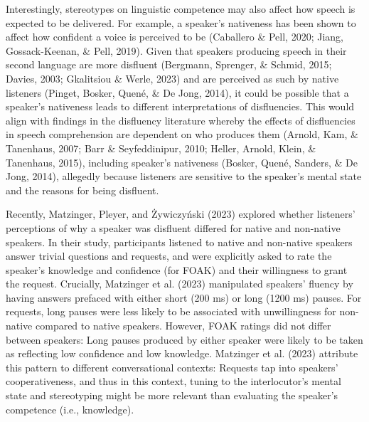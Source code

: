 \documentclass[
  man,floatsintext]{apa7}
\begin{document}
Interestingly, stereotypes on linguistic competence may also affect how speech is expected to be delivered. For example, a speaker's nativeness has been shown to affect how confident a voice is perceived to be (Caballero \& Pell, 2020; Jiang, Gossack-Keenan, \& Pell, 2019). Given that speakers producing speech in their second language are more disfluent (Bergmann, Sprenger, \& Schmid, 2015; Davies, 2003; Gkalitsiou \& Werle, 2023) and are perceived as such by native listeners (Pinget, Bosker, Quené, \& De Jong, 2014), it could be possible that a speaker's nativeness leads to different interpretations of disfluencies. This would align with findings in the disfluency literature whereby the effects of disfluencies in speech comprehension are dependent on who produces them (Arnold, Kam, \& Tanenhaus, 2007; Barr \& Seyfeddinipur, 2010; Heller, Arnold, Klein, \& Tanenhaus, 2015), including speaker's nativeness (Bosker, Quené, Sanders, \& De Jong, 2014), allegedly because listeners are sensitive to the speaker's mental state and the reasons for being disfluent.

Recently, Matzinger, Pleyer, and Żywiczyński (2023) explored whether listeners' perceptions of why a speaker was disfluent differed for native and non-native speakers. In their study, participants listened to native and non-native speakers answer trivial questions and requests, and were explicitly asked to rate the speaker's knowledge and confidence (for FOAK) and their willingness to grant the request. Crucially, Matzinger et al. (2023) manipulated speakers' fluency by having answers prefaced with either short (200 ms) or long (1200 ms) pauses. For requests, long pauses were less likely to be associated with unwillingness for non-native compared to native speakers. However, FOAK ratings did not differ between speakers: Long pauses produced by either speaker were likely to be taken as reflecting low confidence and low knowledge. Matzinger et al. (2023) attribute this pattern to different conversational contexts: Requests tap into speakers' cooperativeness, and thus in this context, tuning to the interlocutor's mental state and stereotyping might be more relevant than evaluating the speaker's competence (i.e., knowledge).
\end{document}
